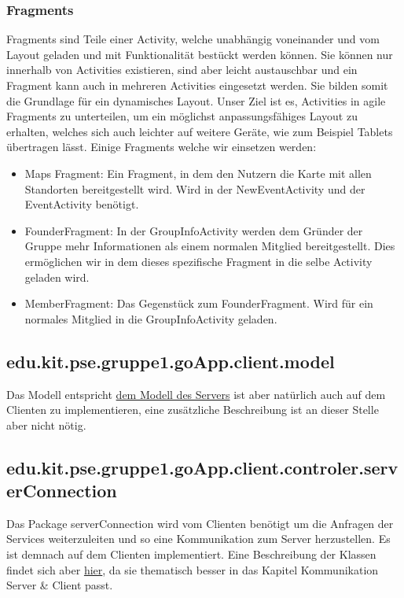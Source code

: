 	 \subsubsection{Fragments}
	 Fragments sind Teile einer Activity, welche unabhängig voneinander und vom Layout geladen und mit Funktionalität bestückt werden können.  
	 Sie können nur innerhalb von Activities existieren, sind aber leicht austauschbar und ein Fragment kann auch in mehreren Activities eingesetzt werden. 
	 Sie bilden somit die Grundlage für ein dynamisches Layout. \newline
	 Unser Ziel ist es, Activities in agile Fragments zu unterteilen, um ein möglichst anpassungsfähiges Layout zu erhalten, welches sich auch leichter auf weitere Geräte, wie zum Beispiel Tablets übertragen lässt.
	 \newline Einige Fragments welche wir einsetzen werden:
	 \begin{itemize}
	 \item Maps Fragment: Ein Fragment, in dem den Nutzern die Karte mit allen Standorten bereitgestellt wird. Wird in der NewEventActivity und der EventActivity benötigt.
	 \item FounderFragment: In der GroupInfoActivity werden dem Gründer der Gruppe mehr Informationen als einem normalen Mitglied bereitgestellt. Dies ermöglichen wir in dem dieses spezifische Fragment in die selbe Activity geladen wird.
	 \item MemberFragment: Das Gegenstück zum FounderFragment. Wird für ein normales Mitglied in die GroupInfoActivity geladen.
	 \end{itemize}
	 
	\subsection{edu.kit.pse.gruppe1.goApp.client.model}
	Das Modell entspricht \hyperlink{ServerModel}{dem Modell des Servers} ist aber natürlich auch auf dem Clienten zu implementieren, eine zusätzliche Beschreibung ist an dieser Stelle aber nicht nötig.
	
	\subsection{edu.kit.pse.gruppe1.goApp.client.controler.serverConnection}
	Das Package serverConnection wird vom Clienten benötigt um die Anfragen der Services weiterzuleiten und so eine Kommunikation zum Server herzustellen. Es ist demnach auf dem Clienten implementiert. Eine Beschreibung der Klassen findet sich aber \hyperlink{ServerConnection}{hier}, da sie thematisch besser in das Kapitel Kommunikation Server \& Client passt.